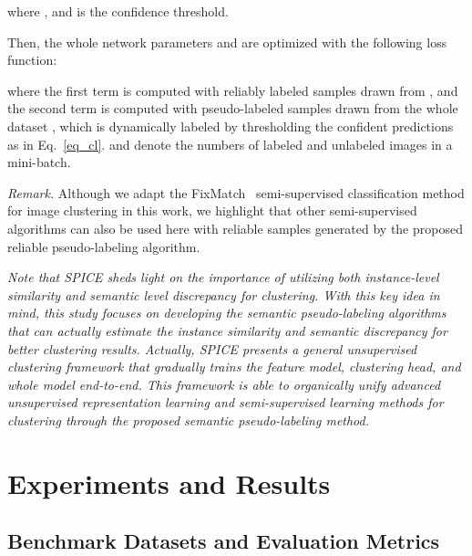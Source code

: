 \documentclass[journal]{IEEEtran}
\begin{document}
where , and  is the confidence threshold.



Then, the whole network parameters  and  are optimized with the following loss function:



where the first term is computed with reliably labeled samples  drawn from , and the second term is computed with pseudo-labeled samples  drawn from the whole dataset , which is dynamically labeled by thresholding the confident predictions as in Eq.~\eqref{eq_cl}.
 and  denote the numbers of labeled and unlabeled images in a mini-batch.

\noindent\emph{Remark.} 
Although we adapt the FixMatch~\cite{fixmatch} semi-supervised classification method for  image clustering in this work, we highlight that other semi-supervised algorithms can also be used here with reliable samples generated by the proposed reliable pseudo-labeling algorithm.



\emph{Note that SPICE sheds light on the importance of utilizing both instance-level similarity and semantic level discrepancy for clustering.
With this key idea in mind, this study focuses on developing the semantic pseudo-labeling algorithms that can actually estimate the instance similarity and semantic discrepancy for better clustering results.
Actually, SPICE presents a general unsupervised clustering framework that gradually trains the feature model, clustering head, and whole model end-to-end.
This framework is able to organically unify advanced unsupervised representation learning and semi-supervised learning methods for clustering through the proposed semantic pseudo-labeling method.}
 

\section{Experiments and Results}

\subsection{Benchmark Datasets and Evaluation Metrics}
\end{document}
